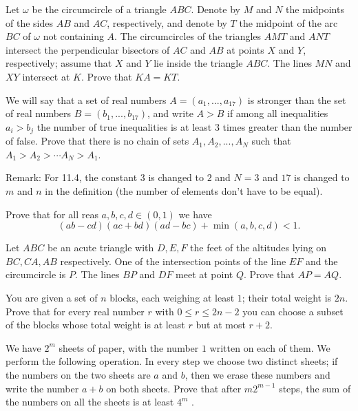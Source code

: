 \documentclass[11pt]{scrartcl}
\begin{document}
\begin{problem}[33618537498844]
Let $\omega$ be the circumcircle of a triangle $ABC$. Denote by $M$ and $N$ the midpoints of the sides $AB$ and $AC$, respectively, and denote by $T$ the midpoint of the arc $BC$ of $\omega$ not containing $A$. The circumcircles of the triangles $AMT$ and $ANT$ intersect the perpendicular bisectors of $AC$ and $AB$ at points $X$ and $Y$, respectively; assume that $X$ and $Y$ lie inside the triangle $ABC$. The lines $MN$ and $XY$ intersect at $K$. Prove that $KA=KT$.
\end{problem}
\begin{problem}[35724831608408]
	We will say that a set of real numbers $A = (a_1,... , a_{17})$ is stronger than the set of real numbers $B = (b_1, . . . , b_{17})$, and write $A >B$ if among all inequalities $a_i > b_j$ the number of true inequalities is at least $3$ times greater than the number of false. Prove that there is no chain of sets $A_1, A_2, .  .  .  , A_N$ such that $A_1>A_2> \cdots A_N>A_1$.

Remark: For 11.4, the constant $3$ is changed to $2$ and $N=3$ and $17$ is changed to $m$ and $n$ in the definition (the number of elements don't have to be equal).
\end{problem}
\begin{problem}[37251973283520]
	Prove that for all reas $a,b,c,d\in(0,1)$ we have$$\left(ab-cd\right)\left(ac+bd\right)\left(ad-bc\right)+\min{\left(a,b,c,d\right)} < 1.$$
\end{problem}
\begin{problem}[37302962546151]
Let $ABC$ be an acute triangle with $D, E, F$ the feet of the altitudes lying on $BC, CA, AB$ respectively. One of the intersection points of the line $EF$ and the circumcircle is $P.$ The lines $BP$ and $DF$ meet at point $Q.$ Prove that $AP = AQ.$
\end{problem}
\begin{problem}[37921131297270]
	You are given a set of $n$ blocks, each weighing at least $1$; their total weight is $2n$. Prove that for every real number $r$ with $0 \leq r \leq 2n-2$ you can choose a subset of the blocks whose total weight is at least $r$ but at most $r + 2$.
\end{problem}
\begin{problem}[42799615327279]
We have $2^m$ sheets of paper, with the number $1$ written on each of them. We perform the following operation. In every step we choose two distinct sheets; if the numbers on the two sheets are $a$ and $b$, then we erase these numbers and write the number $a + b$ on both sheets. Prove that after $m2^{m -1}$ steps, the sum of the numbers on all the sheets is at least $4^m$ .
\end{problem}
\end{document}
